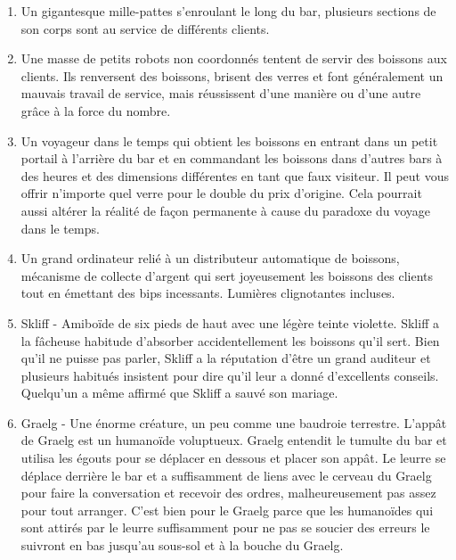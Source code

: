 \documentclass{article}
\begin{document}
\title{\vspace{-0.5cm}{\Huge 100 Unusual SciFi bartender} \vspace{-1cm}}

\date{}

\maketitle

\begin{enumerate}
	\item Un gigantesque mille-pattes s’enroulant le long du bar, plusieurs sections de son corps sont au service de différents clients.
	\item Une masse de petits robots non coordonnés tentent de servir des boissons aux clients. Ils renversent des boissons, brisent des verres et font généralement un mauvais travail de service, mais réussissent d'une manière ou d'une autre grâce à la force du nombre.
	\item Un voyageur dans le temps qui obtient les boissons en entrant dans un petit portail à l'arrière du bar et en commandant les boissons dans d'autres bars à des heures et des dimensions différentes en tant que faux visiteur. Il peut vous offrir n'importe quel verre pour le double du prix d'origine. Cela pourrait aussi altérer la réalité de façon permanente à cause du paradoxe du voyage dans le temps.
	\item Un grand ordinateur relié à un distributeur automatique de boissons, mécanisme de collecte d'argent qui sert joyeusement les boissons des clients tout en émettant des bips incessants. Lumières clignotantes incluses.
	\item Skliff - Amiboïde de six pieds de haut avec une légère teinte violette. Skliff a la fâcheuse habitude d'absorber accidentellement les boissons qu'il sert. Bien qu'il ne puisse pas parler, Skliff a la réputation d'être un grand auditeur et plusieurs habitués insistent pour dire qu'il leur a donné d'excellents conseils. Quelqu’un a même affirmé que Skliff a sauvé son mariage.
	\item Graelg - Une énorme créature, un peu comme une baudroie terrestre. L’appât de Graelg est un humanoïde voluptueux. Graelg entendit le tumulte du bar et utilisa les égouts pour se déplacer en dessous et placer son appât. Le leurre se déplace derrière le bar et a suffisamment de liens avec le cerveau du Graelg pour faire la conversation et recevoir des ordres, malheureusement pas assez pour tout arranger. C'est bien pour le Graelg parce que les humanoïdes qui sont attirés par le leurre suffisamment pour ne pas se soucier des erreurs le suivront en bas jusqu'au sous-sol et à la bouche du Graelg.

\end{enumerate}
\end{document}
